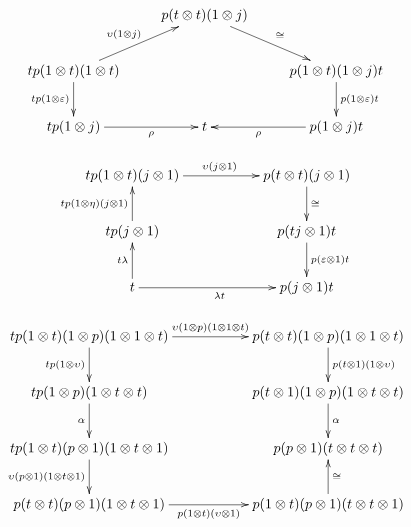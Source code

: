 \documentclass{beamer}
\begin{document}
\begin{frame}
\begin{equation*}\label{fusionax2}
\begin{aligned}
\xymatrix{
& p(t \otimes t)(1\otimes j) \ar[rd]^-{\phantom{A}\cong}  & \\
tp(1\otimes t)(1\otimes t) \ar[ru]^-{\upsilon (1\otimes j)\phantom{A}} \ar[d]_-{tp(1\otimes \varepsilon)} & & p(1\otimes t)(1\otimes j)t \ar[d]^-{p(1\otimes \varepsilon)t} \\
tp(1\otimes j) \ar[r]_-{\rho} & t & p(1\otimes j)t \ar[l]^-{\rho}    
}
\end{aligned}
\end{equation*}

\begin{equation*}\label{fusionax3}
\begin{aligned}
\xymatrix{
tp(1\otimes t)(j\otimes 1) \ar[rr]^{\upsilon (j\otimes 1)} & &p(t\otimes t)(j\otimes 1) \ar[d]^{\cong} \\
tp(j\otimes 1) \ar[u]^{tp(1\otimes \eta)(j\otimes 1)} & & p(tj\otimes 1)t \ar[d]^{p(\varepsilon \otimes 1)t} \\
t \ar[rr]_{\lambda t}  \ar[u]^{t\lambda} & & p(j\otimes 1)t 
}
\end{aligned}
\end{equation*}
\end{frame}
\begin{frame}
\begin{equation*}\label{fusionax1}
\begin{aligned}
\xymatrix{
tp(1\otimes t)(1\otimes p)(1\otimes 1\otimes t) \ar[d]_-{tp(1\otimes \upsilon)} \ar[rr]^-{\upsilon(1\otimes p)(1\otimes 1\otimes t)} & & p(t\otimes t)(1\otimes p)(1\otimes 1\otimes t) \ar[d]^-{p(t\otimes 1)(1\otimes \upsilon)}\\
tp(1\otimes p)(1\otimes t\otimes t) \ar[d]_-{\alpha}  & & p(t\otimes 1)(1\otimes p)(1\otimes t\otimes t) \ar[d]^-{\alpha}  \\
tp(1\otimes t)(p\otimes 1)(1\otimes t\otimes 1) \ar[d]_-{\upsilon (p\otimes 1)(1\otimes t\otimes 1)} & & p(p\otimes 1)(t\otimes t\otimes t)  \\
p(t\otimes t)(p\otimes 1)(1\otimes t\otimes1) \ar[rr]_{ p(1\otimes t)( \upsilon \otimes 1)} & &  p(1\otimes t)(p\otimes 1)(t\otimes t\otimes 1)  \ar[u]_-{\cong} \\
}
\end{aligned}
\end{equation*}

\end{frame}
\end{document}
